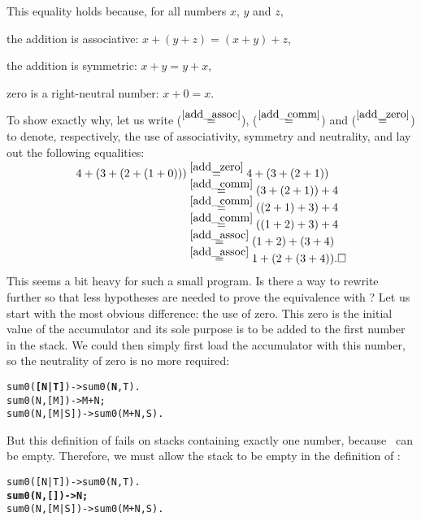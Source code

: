 This equality holds because, for all numbers \(x\), \(y\) and
\(z\),\label{proof_sum}
\begin{enumerate*}

  \item \label{add_assoc} the addition is associative: \(x + (y + z) =
    (x + y) + z\),

  \item \label{add_comm} the addition is symmetric: \(x + y = y +
    x\),

  \item \label{add_zero} zero is a right\hyp{}neutral number: \(x+0 =
    x\).

\end{enumerate*}
To show exactly why, let us write (\(\mathrel{\stackrel{\smash{\ref{add_assoc}}}{=}}\)),
(\(\mathrel{\stackrel{\smash{\ref{add_comm}}}{=}}\)) and (\(\mathrel{\stackrel{\smash{\ref{add_zero}}}{=}}\)) to denote,
respectively, the use of associativity, symmetry and neutrality, and
lay out the following equalities:
\begin{align*}
4 + (3 + (2 + (1 + 0)))
  &\eqn{\smash{\ref{add_zero}}}  4 + (3 + (2 + 1))\\
  &\eqn{\smash{\ref{add_comm}}}  (3 + (2 + 1)) + 4\\
  &\eqn{\smash{\ref{add_comm}}}  ((2 + 1) + 3) + 4\\
  &\eqn{\smash{\ref{add_comm}}}  ((1 + 2) + 3) + 4\\
  &\eqn{\smash{\ref{add_assoc}}} (1 + 2) + (3 + 4)\\
  &\eqn{\smash{\ref{add_assoc}}} 1 + (2 + (3 + 4)).\hfill\Box 
\end{align*}
This seems a bit heavy for such a small program. Is there a way to
rewrite further  so that less hypotheses are needed
to prove the equivalence with ? Let us start with the
most obvious difference: the use of zero. This zero is the initial
value of the accumulator and its sole purpose is to be added to the
first number in the stack. We could then simply first load the
accumulator with this number, so the neutrality of zero is no more
required:
\begin{alltt}
sum0(\textbf{[N|T]})   -> sum0(\textbf{N},T).
sum0(N,[M])   -> M+N;
sum0(N,[M|S]) -> sum0(M+N,S).
\end{alltt}
But this definition of  fails on stacks containing
exactly one number, because ~can be empty. Therefore, we
must allow the stack to be empty in the definition of
:
\begin{alltt}
sum0([N|T])   -> sum0(N,T).
\textbf{sum0(N,   []) -> N;}
sum0(N,[M|S]) -> sum0(M+N,S).
\end{alltt}
